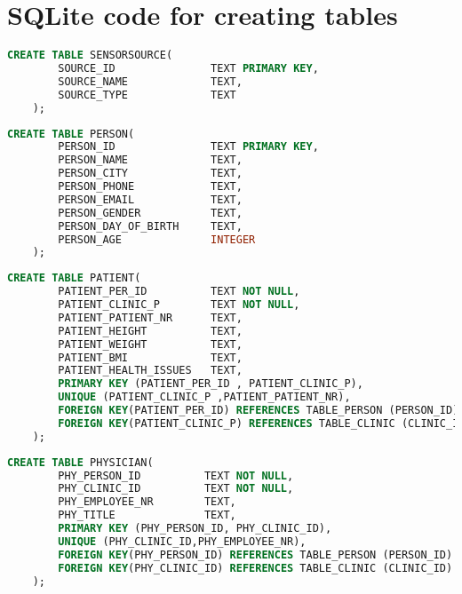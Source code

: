
\chapter{SQLite code for creating tables} %
\label{AppendixB} %
\begin{lstlisting}[caption={SQLite code for creating table SensorSource}, label = {listing:SQLSensorSource},language=SQL]
    CREATE TABLE SENSORSOURCE(
	    SOURCE_ID               TEXT PRIMARY KEY,
	    SOURCE_NAME             TEXT,
	    SOURCE_TYPE             TEXT
	);
\end{lstlisting}
\begin{lstlisting}[caption={SQLite code for creating table Patient}, label = {listing:SQLPerson},language=SQL]
    CREATE TABLE PERSON(
	    PERSON_ID               TEXT PRIMARY KEY,
        PERSON_NAME             TEXT, 
        PERSON_CITY             TEXT, 
        PERSON_PHONE            TEXT, 
        PERSON_EMAIL            TEXT, 
        PERSON_GENDER           TEXT, 
        PERSON_DAY_OF_BIRTH     TEXT, 
        PERSON_AGE              INTEGER
    );
\end{lstlisting}
\begin{lstlisting}[caption={SQLite code for creating table Patient}, label = {listing:SQLPatient},language=SQL]
    CREATE TABLE PATIENT(
    	PATIENT_PER_ID          TEXT NOT NULL, 
        PATIENT_CLINIC_P        TEXT NOT NULL, 
        PATIENT_PATIENT_NR      TEXT, 
        PATIENT_HEIGHT          TEXT, 
        PATIENT_WEIGHT          TEXT, 
        PATIENT_BMI             TEXT, 
        PATIENT_HEALTH_ISSUES   TEXT, 
        PRIMARY KEY (PATIENT_PER_ID , PATIENT_CLINIC_P), 
        UNIQUE (PATIENT_CLINIC_P ,PATIENT_PATIENT_NR), 
        FOREIGN KEY(PATIENT_PER_ID) REFERENCES TABLE_PERSON (PERSON_ID) ON DELETE CASCADE,
        FOREIGN KEY(PATIENT_CLINIC_P) REFERENCES TABLE_CLINIC (CLINIC_ID) ON DELETE CASCADE 
    );
\end{lstlisting}
\begin{lstlisting}[caption={SQLite code for creating table Physician}, label = {listing:SQLPhysician},language=SQL]
    CREATE TABLE PHYSICIAN(
    	PHY_PERSON_ID          TEXT NOT NULL, 
        PHY_CLINIC_ID          TEXT NOT NULL, 
        PHY_EMPLOYEE_NR        TEXT, 
        PHY_TITLE              TEXT, 
        PRIMARY KEY (PHY_PERSON_ID, PHY_CLINIC_ID), 
        UNIQUE (PHY_CLINIC_ID,PHY_EMPLOYEE_NR), 
        FOREIGN KEY(PHY_PERSON_ID) REFERENCES TABLE_PERSON (PERSON_ID) ON DELETE CASCADE, 
        FOREIGN KEY(PHY_CLINIC_ID) REFERENCES TABLE_CLINIC (CLINIC_ID) ON DELETE CASCADE 
    );
\end{lstlisting}
